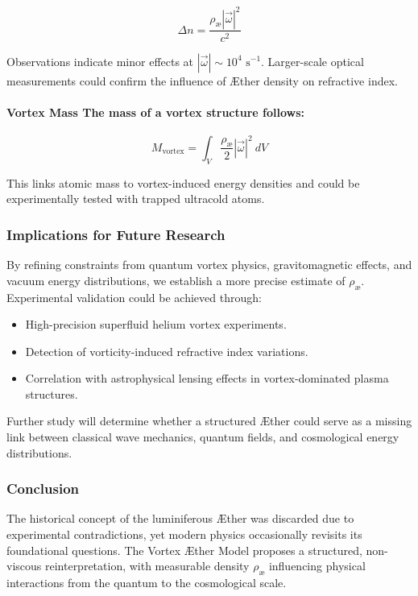 \begin{equation*}
\Delta n = \frac{\rho_\text{\ae} |\vec{\omega}|^2}{c^2}
\end{equation*}

Observations indicate minor effects at $|\vec{\omega}| \sim 10^4 \text{ s}^{-1}$. Larger-scale optical measurements could confirm the influence of Æther density on refractive index.

\paragraph{Vortex Mass The mass of a vortex structure follows:}

\begin{equation*}
M_{\text{vortex}} = \int_V \frac{\rho_\text{\ae}}{2} | \vec{\omega}|^2 \ dV
\end{equation*}

This links atomic mass to vortex-induced energy densities and could be experimentally tested with trapped ultracold atoms.


\subsubsection*{Implications for Future Research}
By refining constraints from quantum vortex physics, gravitomagnetic effects, and vacuum energy distributions, we establish a more precise estimate of $ \rho_\text{\ae} $. Experimental validation could be achieved through:
\begin{itemize}
    \item High-precision superfluid helium vortex experiments.
    \item Detection of vorticity-induced refractive index variations.
    \item Correlation with astrophysical lensing effects in vortex-dominated plasma structures.
\end{itemize}
Further study will determine whether a structured Æther could serve as a missing link between classical wave mechanics, quantum fields, and cosmological energy distributions.

\subsubsection*{Conclusion}
The historical concept of the luminiferous Æther was discarded due to experimental contradictions, yet modern physics occasionally revisits its foundational questions. The Vortex Æther Model proposes a structured, non-viscous reinterpretation, with measurable density $ \rho_\text{\ae} $ influencing physical interactions from the quantum to the cosmological scale.




